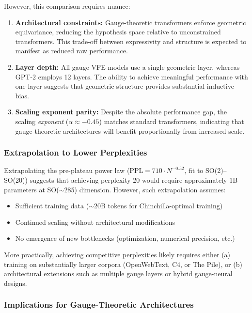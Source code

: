 \documentclass[twoside,11pt]{article}
\begin{document}
However, this comparison requires nuance:
\begin{enumerate}
    \item \textbf{Architectural constraints:} Gauge-theoretic transformers enforce geometric equivariance, reducing the hypothesis space relative to unconstrained transformers. This trade-off between expressivity and structure is expected to manifest as reduced raw performance.

    \item \textbf{Layer depth:} All gauge VFE models use a single geometric layer, whereas GPT-2 employs 12 layers. The ability to achieve meaningful performance with one layer suggests that geometric structure provides substantial inductive bias.

    \item \textbf{Scaling exponent parity:} Despite the absolute performance gap, the scaling \emph{exponent} ($\alpha \approx -0.45$) matches standard transformers, indicating that gauge-theoretic architectures will benefit proportionally from increased scale.
\end{enumerate}

\subsubsection{Extrapolation to Lower Perplexities}

Extrapolating the pre-plateau power law ($\text{PPL} = 710 \cdot N^{-0.52}$, fit to SO(2)--SO(20)) suggests that achieving perplexity 20 would require approximately 1B parameters at SO($\sim$285) dimension. However, such extrapolation assumes:
\begin{itemize}
    \item Sufficient training data ($\sim$20B tokens for Chinchilla-optimal training)
    \item Continued scaling without architectural modifications
    \item No emergence of new bottlenecks (optimization, numerical precision, etc.)
\end{itemize}

More practically, achieving competitive perplexities likely requires either (a) training on substantially larger corpora (OpenWebText, C4, or The Pile), or (b) architectural extensions such as multiple gauge layers or hybrid gauge-neural designs.

\subsubsection{Implications for Gauge-Theoretic Architectures}
\end{document}
